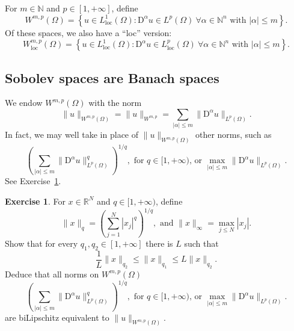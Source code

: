 \documentclass[a4paper,9pt]{amsart}
\newcommand{\N}{\mathbb{N}}	%
\newcommand{\R}{\mathbb{R}}	%
\newcommand{\Diff}{\mathrm{D}}
\newcommand{\loc}{\mathrm{loc}}
\theoremstyle{plain}
\theoremstyle{definition}
\newtheorem{exercise}[proposition]{Exercise}%
\theoremstyle{remark}
\begin{document}
For $m\in\N$ and $p\in[1,+\infty]$, define
\begin{equation}\label{eq680b26ee}
	W^{m,p}(\Omega) = \left\{u\in L^1_\loc(\Omega): \Diff^\alpha u\in L^p(\Omega)\ \forall\alpha\in\N^n\text{ with }|\alpha|\le m \right\} .
\end{equation}
Of these spaces, we also have a ``loc'' version:
\begin{equation}\label{eq680b26f4}
	W^{m,p}_\loc(\Omega) = \left\{u\in L^1_\loc(\Omega): \Diff^\alpha u\in L^p_\loc(\Omega)\ \forall\alpha\in\N^n\text{ with }|\alpha|\le m \right\} .
\end{equation}

\subsection{Sobolev spaces are Banach spaces}
We endow $W^{m,p}(\Omega)$ with the norm
\begin{equation}\label{eq680b27c5}
	\|u\|_{W^{m,p}(\Omega)}
	= \|u\|_{W^{m,p}}
	= \sum_{|\alpha|\le m} \|\Diff^\alpha u\|_{L^p(\Omega)} .
\end{equation} 
In fact, we may well take in place of $\|u\|_{W^{m,p}(\Omega)}$ other norms, such as
\begin{equation}\label{eq680b27ca}
	(\sum_{|\alpha|\le m} \|\Diff^\alpha u\|_{L^p(\Omega)}^q)^{1/q},
	\text{ for $q\in[1,+\infty)$, or }
	\max_{|\alpha|\le m} \|\Diff^\alpha u\|_{L^p(\Omega)} .
\end{equation}
See Exercise~\ref{eq680b28e2}.

\begin{exercise}\label{eq680b28e2}
	For $x\in\R^N$ and $q\in[1,+\infty)$, define
	\begin{equation}
		\|x\|_q = (\sum_{j=1}^N |x_j|^q )^{1/q} ,
		\text{ and }\|x\|_\infty = \max_{j\le N} |x_j| .
	\end{equation}
	Show that for every $q_1,q_2\in[1,+\infty]$ there is $L$ such that
	\begin{equation}
		\frac1L \|x\|_{q_2} \le \|x\|_{q_1} \le L \|x\|_{q_2} .
	\end{equation}
	Deduce that all norms on $W^{m,p}(\Omega)$
	\begin{equation}\label{eq680b27ca}
		(\sum_{|\alpha|\le m} \|\Diff^\alpha u\|_{L^p(\Omega)}^q)^{1/q},
		\text{ for $q\in[1,+\infty)$, or }
		\max_{|\alpha|\le m} \|\Diff^\alpha u\|_{L^p(\Omega)} .
	\end{equation}
	are biLipschitz equivalent to $\|u\|_{W^{m,p}(\Omega)}$.
\end{exercise}
\end{document}
